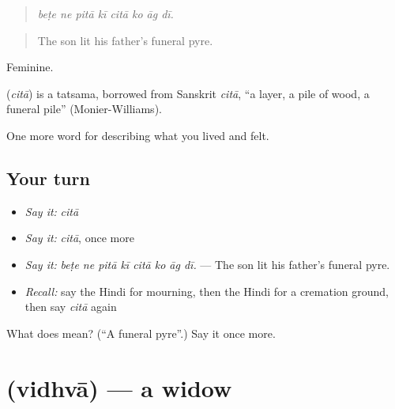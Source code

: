\begin{quote}
       
\end{quote}

\begin{quote}
\emph{beṭe ne pitā kī citā ko āg dī.}
\end{quote}

\begin{quote}
The son lit his father's funeral pyre.
\end{quote}

Feminine.

\begin{cousinweb}
\textbf{} (\emph{citā}) is a tatsama, borrowed from Sanskrit \emph{citā}, \textquotedblleft{}a layer, a pile of wood, a funeral pile\textquotedblright{} (Monier-Williams).
\end{cousinweb}

\begin{grammarlens}[title={What you've built}]
One more word for describing what you lived and felt.
\end{grammarlens}

\subsection*{Your turn}
\begin{itemize}
\raggedright
  \item \emph{Say it:} \emph{citā}
  \item \emph{Say it:} \emph{citā}, once more
  \item \emph{Say it:} \emph{beṭe ne pitā kī citā ko āg dī.} — The son lit his father's funeral pyre.
  \item \emph{Recall:} say the Hindi for mourning, then the Hindi for a cremation ground, then say \emph{citā} again
\end{itemize}

\begin{tcolorbox}[breakable,colback=teal!4,colframe=teal!35!black,title={Before you move on}]
What does  mean? (\textquotedblleft{}A funeral pyre\textquotedblright{}.) Say it once more.
\end{tcolorbox}
\section[\texorpdfstring{\hi{विधवा} (vidhvā)}{विधवा (vidhvā)}]{ (vidhvā) — a widow}

